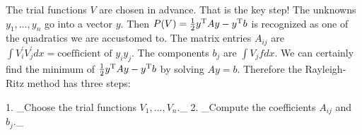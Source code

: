 The trial functions \(V\) are chosen in advance. That is the key step! The unknowns \(y_{1},\ldots,y_{n}\) go into a vector \(y\). Then \(P(V)=\frac{1}{2}y^{\rm T}Ay-y^{\rm T}b\) is recognized as one of the quadratics we are accustomed to. The matrix entries \(A_{ij}\) are \(\int V_{i}^{\prime}V_{j}^{\prime}dx=\mbox{coefficient of }y_{i}y_{j}\). The components \(b_{j}\) are \(\int V_{j}fdx\). We can certainly find the minimum of \(\frac{1}{2}y^{\rm T}Ay-y^{\rm T}b\) by solving \(Ay=b\). Therefore the Rayleigh-Ritz method has three steps:

1. _Choose the trial functions \(V_{1},\ldots,V_{n}\)._
2. _Compute the coefficients \(A_{ij}\) and \(b_{j}\)._ 